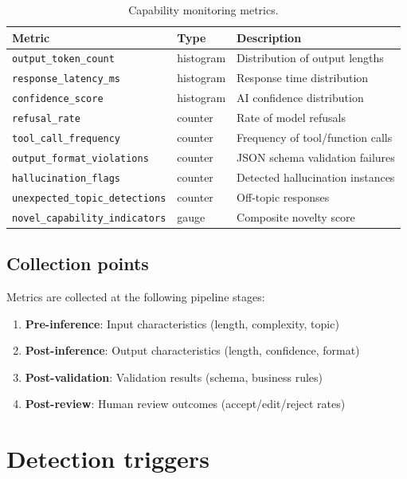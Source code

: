 \documentclass[11pt,a4paper,twoside]{report}
\begin{document}
\begin{table}[htbp]
\centering
\caption{Capability monitoring metrics.}
\label{tab:monitor-metrics}
\footnotesize
\begin{tabularx}{\linewidth}{@{}l l X@{}}
\toprule
\textbf{Metric} & \textbf{Type} & \textbf{Description} \\ \midrule
\texttt{output\_token\_count} & histogram & Distribution of output lengths \\
\texttt{response\_latency\_ms} & histogram & Response time distribution \\
\texttt{confidence\_score} & histogram & AI confidence distribution \\
\texttt{refusal\_rate} & counter & Rate of model refusals \\
\texttt{tool\_call\_frequency} & counter & Frequency of tool/function calls \\
\texttt{output\_format\_violations} & counter & JSON schema validation failures \\
\texttt{hallucination\_flags} & counter & Detected hallucination instances \\
\texttt{unexpected\_topic\_detections} & counter & Off-topic responses \\
\texttt{novel\_capability\_indicators} & gauge & Composite novelty score \\
\bottomrule
\end{tabularx}
\end{table}

\subsection{Collection points}

Metrics are collected at the following pipeline stages:

\begin{enumerate}
\item \textbf{Pre-inference}: Input characteristics (length, complexity, topic)
\item \textbf{Post-inference}: Output characteristics (length, confidence, format)
\item \textbf{Post-validation}: Validation results (schema, business rules)
\item \textbf{Post-review}: Human review outcomes (accept/edit/reject rates)
\end{enumerate}

\section{Detection triggers}
\end{document}
